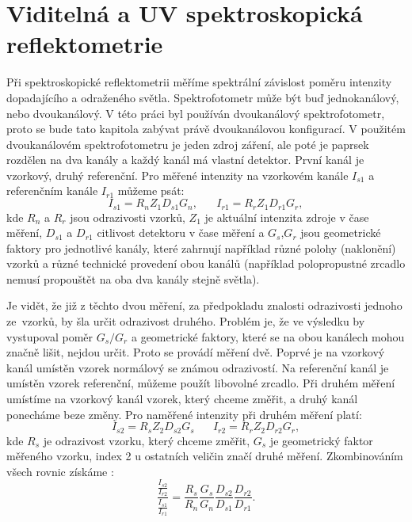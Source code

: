 \documentclass[12pt,oneside,final]{fithesis2}
\begin{document}
\section{Viditelná a UV spektroskopická reflektometrie}
Při spektroskopické reflektometrii měříme spektrální závislost poměru intenzity dopadajícího a odraženého světla. Spektrofotometr může být buď jednokanálový, nebo dvoukanálový. V této práci byl používán dvoukanálový spektrofotometr, proto se bude tato kapitola zabývat právě dvoukanálovou konfigurací. V použitém dvoukanálovém spektrofotometru je jeden zdroj záření, ale poté je paprsek rozdělen na dva kanály a každý kanál má vlastní detektor. První kanál je vzorkový, druhý referenční. Pro měřené intenzity na vzorkovém kanále $I_{s1}$ a referenčním kanále $I_{r1}$ můžeme psát:
\begin{equation} I_{s1} = R_n Z_1 D_{s1} G_n \mathrm{,}\;\;\;\;\;\; I_{r1} = R_r Z_1 D_{r1} G_r \mathrm{,}\end{equation}
kde $R_n$ a $R_r$ jsou odrazivosti vzorků, $Z_1$ je aktuální intenzita zdroje v čase měření, $D_{s1}$ a $D_{r1}$ citlivost detektoru v čase měření a $G_s$,$G_r$ jsou geometrické faktory pro jednotlivé kanály, které zahrnují například různé polohy (naklonění) vzorků a různé technické provedení obou kanálů (například polopropustné zrcadlo nemusí propouštět na oba dva kanály stejně světla). 

Je vidět, že již z těchto dvou měření, za předpokladu znalosti odrazivosti jednoho ze~vzorků, by šla určit odrazivost druhého. Problém je, že ve výsledku by vystupoval poměr $G_s/G_r$ a geometrické faktory, které se na obou kanálech mohou značně lišit, nejdou určit. Proto se provádí měření dvě. Poprvé je na vzorkový kanál umístěn vzorek normálový se známou odrazivostí. Na referenční kanál je umístěn vzorek referenční, můžeme použít libovolné zrcadlo. Při druhém měření umístíme na vzorkový kanál vzorek, který chceme změřit, a druhý kanál ponecháme beze změny. Pro naměřené intenzity při druhém měření platí:
\begin{equation} I_{s2} = R_s Z_2 D_{s2} G_s \;\;\;\;\;\; I_{r2} = R_r Z_2 D_{r2} G_r \mathrm{,}\end{equation}
kde $R_s$ je odrazivost vzorku, který chceme změřit, $G_s$ je geometrický faktor měřeného vzorku, index 2 u ostatních veličin značí druhé měření. Zkombinováním všech rovnic získáme \cite{necas}:
\begin{equation}  \displaystyle\frac{ \displaystyle\frac{I_{s2}}{I_{r2}} }{ \displaystyle\frac{I_{s1}}{I_{r1}} } = \frac{R_s}{R_n} \frac{G_s}{G_n}\frac{D_{s2}}{D_{s1}}\frac{D_{r2}}{D_{r1}}\mathrm{.}\end{equation}
\end{document}
